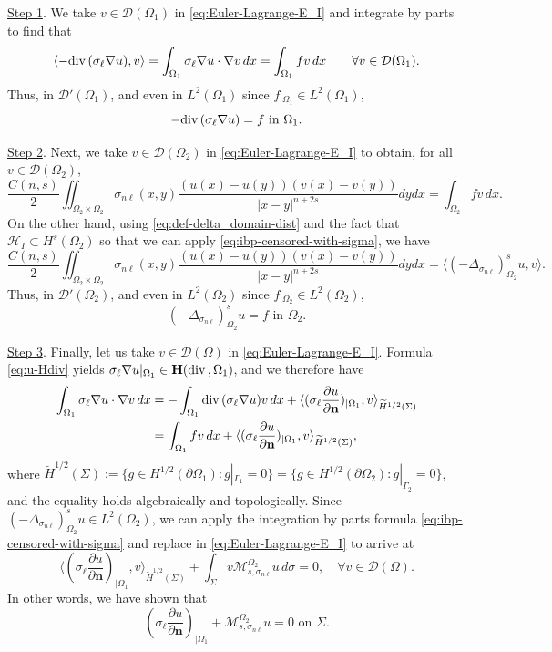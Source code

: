 \documentclass{amsart}
\newcommand{\Ol}{\Omega_{1}}%
\newcommand{\Onl}{\Omega_{2}}%
\newcommand{\Gl}{{\Gamma_1}}%
\newcommand{\Gnl}{{\Gamma_2}}%
\renewcommand{\sl}{{\sigma_\ell}}
\newcommand{\snl}{{\sigma_{n\ell}}}
\def\vn{{\mathbf n}}
\def\Om{\Omega}
\newcommand{\Msnl}{\mathcal{M}_{s,\snl}}
\renewcommand{\div}{{\rm div}\,}
\theoremstyle{plain}
\numberwithin{equation}{section}
\numberwithin{table}{section}
\numberwithin{figure}{section}
\numberwithin{theorem}{section}
\numberwithin{corollary}{section}
\numberwithin{definition}{section}
\numberwithin{lemma}{section}
\numberwithin{proposition}{section}
\numberwithin{remark}{section}
\begin{document}
\noindent
\underline{Step 1}. 
We take $v\in{\mathcal D}(\Ol)$ in \eqref{eq:Euler-Lagrange-E_I} and integrate by parts to find that
\[ \langle -\div (\sl \nabla u), v \rangle = \int_{\Ol} \sl \nabla u \cdot \nabla v\, dx = \int_{\Ol} f v \, dx \qquad \forall v \in {\mathcal D}(\Ol). \]
Thus, in ${\mathcal D}'(\Ol)$, and even in $L^2(\Ol)$ since $f_{|\Ol}\in L^2(\Ol)$,
\begin{equation} \label{eq:u-Hdiv}
-\div (\sl \nabla u) = f \mbox{ in }\Ol. 
\end{equation}

\smallskip

\noindent
\underline{Step 2}. 
Next, we take $v\in{\mathcal D}(\Onl)$ in \eqref{eq:Euler-Lagrange-E_I} to obtain, for all $v \in {\mathcal D}(\Onl)$,
\[  \frac{C(n,s)}{2} \iint_{\Onl\times\Onl} \snl(x,y) \frac{(u(x)-u(y))(v(x)-v(y))}{|x-y|^{n+2s}} dy dx = \int_{\Onl} f v \, dx. \]
On the other hand, using \eqref{eq:def-delta_domain-dist} and the fact that $\mathcal{H}_{I} \subset H^s(\Onl)$ so that we can apply \eqref{eq:ibp-censored-with-sigma}, we have
\[ \frac{ C(n,s) }{2} \iint_{\Onl\times\Onl} \snl(x,y) \frac{(u(x)-u(y))(v(x)-v(y))}{|x-y|^{n+2s}} dy dx = \langle  (-\Delta_\snl)^s_{\Onl} u, v \rangle.\]
Thus, in ${\mathcal D}'(\Onl)$, and even in $L^2(\Onl)$ since $f_{|\Onl}\in L^2(\Onl)$,
\[ 
(-\Delta_\snl)^s_{\Onl} u = f \mbox{ in }\Onl. 
\]

\smallskip


\noindent
\underline{Step 3}. 
Finally, let us take $v\in{\mathcal D}(\Omega)$ in \eqref{eq:Euler-Lagrange-E_I}. Formula \eqref{eq:u-Hdiv} yields $\sl \nabla u |_{\Ol} \in \mathbf{H}(\div,\Ol)$, and we therefore have
\[ \begin{split}
\int_{\Ol} \sl \nabla u \cdot \nabla v\, dx & = - \int_{\Ol} \div(\sl \nabla u ) v\, dx + \langle (\sl \frac{\partial u}{\partial \vn})_{|\Ol}, v \rangle_{\widetilde{H}^{1/2}(\Sigma)} \\
& = \int_{\Ol} f  v\, dx + \langle (\sl \frac{\partial u}{\partial \vn})_{|\Ol}, v \rangle_{\widetilde{H}^{1/2}(\Sigma)},
\end{split} \]
where $\widetilde{H}^{1/2}(\Sigma):= \{ g \in H^{1/2}(\partial \Ol) \colon g |_{\Gl} = 0 \} = \{ g \in H^{1/2}(\partial \Onl) \colon g |_{\Gnl} = 0 \}$, and the equality holds algebraically and topologically. Since $(-\Delta_\snl)^s_{\Onl} u\in L^2(\Om_2)$, we can apply the integration by parts formula \eqref{eq:ibp-censored-with-sigma} and replace in \eqref{eq:Euler-Lagrange-E_I} to arrive at
\[ \langle (\sl \frac{\partial u}{\partial \vn})_{|\Ol}, v \rangle_{\widetilde{H}^{1/2}(\Sigma)} + \int_{\Sigma} v \Msnl^{\Om_2} u \,d\sigma = 0, \quad \forall v \in {\mathcal D}(\Omega) .\]
In other words, we have shown that
\[ (\sl \frac{\partial u}{\partial \vn})_{|\Ol} + \Msnl^{\Om_2} u = 0 \mbox{ on } \Sigma. \]
\end{document}
